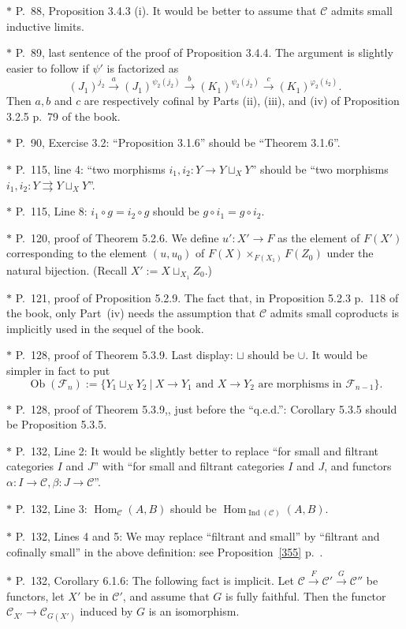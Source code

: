 \documentclass[12pt]{article}
\theoremstyle{remark}
\theoremstyle{definition}
\newcommand{\nn}{\noindent}
\newcommand{\C}{\mathcal C}
\newcommand{\F}{\mathcal F}
\newcommand{\pp}{\varphi}
\newcommand{\parar}{\rightrightarrows}
\newcommand{\xr}{\xrightarrow}
\DeclareMathOperator{\Hom}{Hom}
\DeclareMathOperator{\Ind}{Ind}
\DeclareMathOperator{\Ob}{Ob}
\begin{document}
\nn$*$ P.~88, Proposition 3.4.3 (i). It would be better to assume that $\C$ admits small inductive limits.

\nn$*$ P.~89, last sentence of the proof of Proposition 3.4.4. The argument is slightly easier to follow if $\psi'$ is factorized as 
$$
(J_1)^{j_2}\xr a(J_1)^{\psi_2(j_2)}\xr b(K_1)^{\psi_2(j_2)}\xr c(K_1)^{\pp_2(i_2)}.
$$ 
Then $a,b$ and $c$ are respectively cofinal by Parts (ii), (iii), and (iv) of Proposition 3.2.5 p.~79 of the book.

\nn$*$ P.~90, Exercise 3.2: ``Proposition 3.1.6'' should be ``Theorem 3.1.6''.

\nn$*$ P.~115, line 4: ``two morphisms $i_1,i_2:Y\to Y\sqcup_XY$'' should be ``two morphisms $i_1,i_2:Y\parar Y\sqcup_XY$''. 

\nn$*$ P.~115, Line 8: $i_1\circ g=i_2\circ g$ should be $g\circ i_1=g\circ i_2$.

\nn$*$ P.~120, proof of Theorem 5.2.6. We define $u':X'\to F$ as the element of $F(X')$ corresponding to the element $(u,u_0)$ of $F(X)\times_{F(X_1)}F(Z_0)$ under the natural bijection. (Recall $X':=X\sqcup_{X_1}Z_0$.)

\nn$*$ P.~121, proof of Proposition 5.2.9. The fact that, in Proposition 5.2.3 p.~118 of the book, only Part~(iv) needs the assumption that $\C$ admits small coproducts is implicitly used in the sequel of the book.

\nn$*$ P.~128, proof of Theorem 5.3.9. Last display: $\sqcup$ should be $\cup$. It would be simpler in fact to put 
$$
\Ob(\F_n):=\{Y_1\sqcup_XY_2\ |\ X\to Y_1\text{ and }X\to Y_2\text{ are morphisms in }\F_{n-1}\}.
$$ 

\nn$*$ P.~128, proof of Theorem 5.3.9,, just before the ``q.e.d.'': Corollary 5.3.5 should be Proposition 5.3.5.

\nn$*$ P.~132, Line 2: It would be slightly better to replace ``for small and filtrant categories $I$ and $J$'' with ``for small and filtrant categories $I$ and $J$, and functors $\alpha:I\to\C,\beta:J\to\C$''.

\nn$*$ P.~132, Line 3: $\Hom_\C(A,B)$ should be $\Hom_{\Ind(\C)}(A,B)$.

\nn$*$ P.~132, Lines 4 and 5: \guillemotleft We may replace ``filtrant and small'' by ``filtrant and cofinally small'' in the above definition\guillemotright: see Proposition~\ref{355} p.~\pageref{355}.

\nn$*$ P.~132, Corollary 6.1.6: The following fact is implicit. Let $\C\xrightarrow{F}\C'\xrightarrow{G}\C''$ be functors, let $X'$ be in $\C'$, and assume that $G$ is fully faithful. Then the functor $\C_{X'}\to\C_{G(X')}$ induced by $G$ is an isomorphism.
\end{document}
